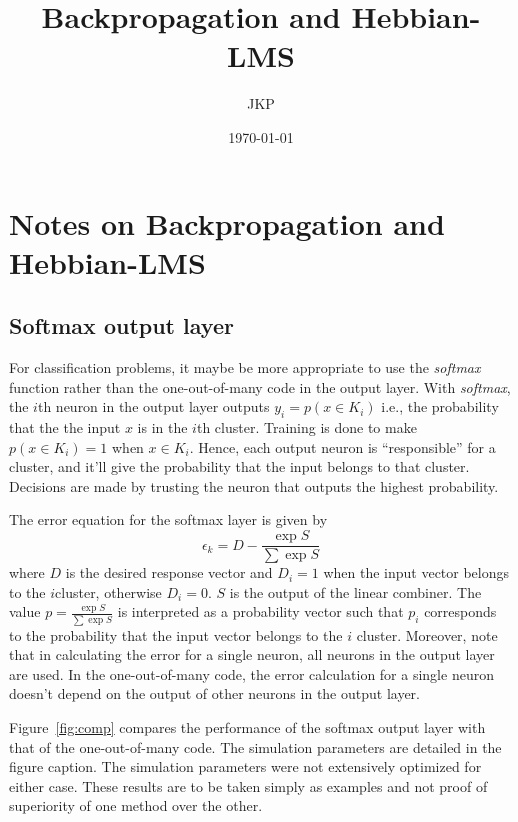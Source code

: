 \documentclass[a4paper]{article}
\title{Backpropagation and Hebbian-LMS}
\author{JKP}
\date{\today}
\begin{document}
\section{Notes on Backpropagation and Hebbian-LMS}
\subsection{Softmax output layer}
For classification problems, it maybe be more appropriate to use the \textit{softmax} function rather than the one-out-of-many code in the output layer. With \textit{softmax}, the $i$th neuron in the output layer outputs $y_i = p(x \in K_i)$ i.e., the probability that the the input $x$ is in the $i$th cluster. Training is done to make $p(x \in K_i) = 1$ when $x \in K_i$. Hence, each output neuron is ``responsible'' for a cluster, and it'll give the probability that the input belongs to that cluster. Decisions are made by trusting the neuron that outputs the highest probability. 

The error equation for the softmax layer is given by
\begin{equation}
\epsilon_k = D - \frac{\exp{S}}{\sum\exp{S}}
\end{equation}
where $D$ is the desired response vector and $D_i = 1$ when the input vector belongs to the $i$cluster, otherwise $D_i = 0$. $S$ is the output of the linear combiner. The value $p = \frac{\exp{S}}{\sum\exp{S}}$ is interpreted as a probability vector such that $p_i$ corresponds to the probability that the input vector belongs to the $i$ cluster. Moreover, note that in calculating the error for a single neuron, all neurons in the output layer are used. In the one-out-of-many code, the error calculation for a single neuron doesn't depend on the output of other neurons in the output layer.

Figure~\ref{fig:comp} compares the performance of the softmax output layer with that of the one-out-of-many code. The simulation parameters are detailed in the figure caption. The simulation parameters were not extensively optimized for either case. These results are to be taken simply as examples and not proof of superiority of one method over the other.
\end{document}
